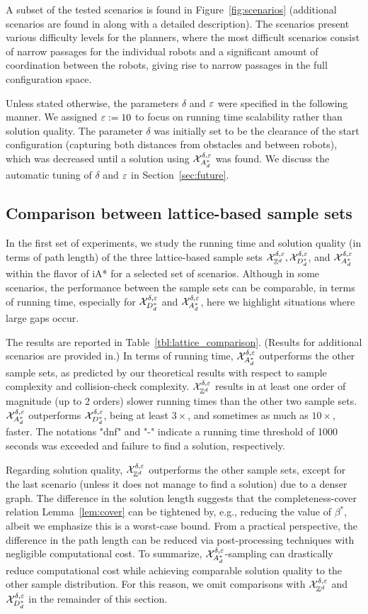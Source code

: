 A subset of the tested scenarios is found in Figure~\ref{fig:scenarios} (additional scenarios are found in along with a detailed description). The scenarios present various difficulty levels for the planners, where the most difficult scenarios consist of narrow passages for the individual robots and a significant amount of coordination between the robots, giving rise to narrow passages in the full configuration space. 

Unless stated otherwise, the parameters $\delta$ and $\varepsilon$ were specified in the following manner. We assigned $\varepsilon:=10$ to focus on running time scalability rather than solution quality. The parameter $\delta$ was initially set to be the clearance of the start configuration (capturing both distances from obstacles and between robots), which was decreased until a solution using $\mathcal{X}_{A_d^*}^{\delta,\varepsilon}$ was found. We discuss the automatic tuning of $\delta$ and $\varepsilon$  in Section~\ref{sec:future}.

\subsection{Comparison between lattice-based sample sets}
In the first set of experiments, we study the running time and solution quality (in terms of path length) of the three lattice-based sample sets $\mathcal{X}_{\mathbb{Z}^d}^{\delta,\varepsilon},\mathcal{X}_{D_d^*}^{\delta,\varepsilon}$, and $\mathcal{X}_{A_d^*}^{\delta,\varepsilon}$ within the \loc flavor of iA* for a selected set of scenarios. Although in some scenarios, the performance between the sample sets can be comparable, in terms of running time, especially for $\mathcal{X}_{D_d^*}^{\delta,\varepsilon}$ and $\mathcal{X}_{A_d^*}^{\delta,\varepsilon}$, here we highlight situations where large gaps occur. 

The results are reported in Table~\ref{tbl:lattice_comparison}. (Results for additional scenarios are provided in.) In terms of running time, $\mathcal{X}_{A_d^*}^{\delta,\varepsilon}$ outperforms the other sample sets, as predicted by our theoretical results with respect to sample complexity and collision-check complexity. $\mathcal{X}_{\mathbb{Z}^d}^{\delta,\varepsilon}$ results in at least one order of magnitude (up to 2 orders) slower running times than the other two sample sets. $\mathcal{X}_{A_d^*}^{\delta,\varepsilon}$ outperforms $\mathcal{X}_{D_d^*}^{\delta,\varepsilon}$, being at least $3\times$, and sometimes as much as $10\times$, faster. The notations "dnf" and "-" indicate a running time threshold of 1000 seconds was exceeded and failure to find a solution, respectively. 

Regarding solution quality, $\mathcal{X}_{\mathbb{Z}^d}^{\delta,\varepsilon}$ outperforms the other sample sets, except for the last scenario (unless it does not manage to find a solution) due to a denser graph. The difference in the solution length suggests that the completeness-cover relation Lemma~\ref{lem:cover} can be tightened by, e.g., reducing the value of ${\beta^*}$, albeit we emphasize this is a worst-case bound. From a practical perspective, the difference in the path length can be reduced via post-processing techniques with negligible computational cost. To summarize, $\mathcal{X}_{A_d^*}^{\delta,\varepsilon}$-sampling can drastically reduce computational cost while achieving comparable solution quality to the other sample distribution. For this reason, we omit comparisons with $\mathcal{X}_{\mathbb{Z}^d}^{\delta,\varepsilon}$ and $\mathcal{X}_{D_d^*}^{\delta,\varepsilon}$ in the remainder of this section. 

